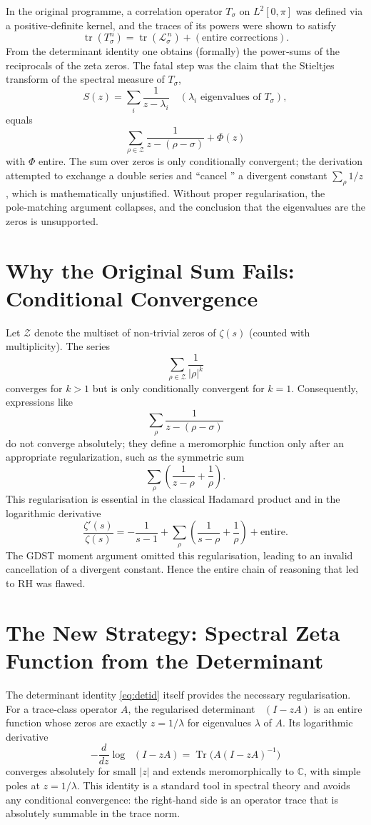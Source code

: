 \documentclass[11pt,a4paper]{article}
\newcommand{\C}{\mathbb{C}}
\newcommand{\LOp}{\mathcal{L}}
\newcommand{\tr}{\operatorname{tr}}
\newcommand{\Tr}{\operatorname{Tr}}
\DeclareMathOperator{\detreg}{det_{(2)}}
\begin{document}
In the original programme, a correlation operator \(T_\sigma\) on \(L^2[0,\pi]\) was defined via a positive‑definite kernel, and the traces of its powers were shown to satisfy
\[
\tr(T_\sigma^n) = \tr(\LOp_\sigma^{\,n}) + (\text{entire corrections}).
\]
From the determinant identity one obtains (formally) the power‑sums of the reciprocals of the zeta zeros. The fatal step was the claim that the Stieltjes transform of the spectral measure of \(T_\sigma\),
\[
S(z) = \sum_i \frac{1}{z - \lambda_i} \quad (\lambda_i \text{ eigenvalues of } T_\sigma),
\]
equals
\[
\sum_{\rho\in\mathcal{Z}} \frac{1}{z - (\rho - \sigma)} + \Phi(z)
\]
with \(\Phi\) entire. The sum over zeros is only conditionally convergent; the derivation attempted to exchange a double series and ``cancel '' a divergent constant \(\sum_\rho 1/z\), which is mathematically unjustified. Without proper regularisation, the pole‑matching argument collapses, and the conclusion that the eigenvalues are the zeros is unsupported.

\section{Why the Original Sum Fails: Conditional Convergence}

Let \(\mathcal{Z}\) denote the multiset of non‑trivial zeros of \(\zeta(s)\) (counted with multiplicity). The series
\[
\sum_{\rho\in\mathcal{Z}} \frac{1}{|\rho|^k}
\]
converges for \(k > 1\) but is only conditionally convergent for \(k = 1\). Consequently, expressions like
\[
\sum_{\rho} \frac{1}{z - (\rho - \sigma)}
\]
do not converge absolutely; they define a meromorphic function only after an appropriate regularization, such as the symmetric sum
\[
\sum_{\rho} \left( \frac{1}{z - \rho} + \frac{1}{\rho} \right).
\]
This regularisation is essential in the classical Hadamard product and in the logarithmic derivative
\[
\frac{\zeta'(s)}{\zeta(s)} = -\frac{1}{s-1} + \sum_{\rho} \left( \frac{1}{s-\rho} + \frac{1}{\rho} \right) + \text{entire}.
\]
The GDST moment argument omitted this regularisation, leading to an invalid cancellation of a divergent constant. Hence the entire chain of reasoning that led to RH was flawed.

\section{The New Strategy: Spectral Zeta Function from the Determinant}

The determinant identity \eqref{eq:detid} itself provides the necessary regularisation. For a trace‑class operator \(A\), the regularised determinant \(\detreg(I - zA)\) is an entire function whose zeros are exactly \(z = 1/\lambda\) for eigenvalues \(\lambda\) of \(A\). Its logarithmic derivative
\[
- \frac{d}{dz} \log \detreg(I - zA) = \Tr\bigl( A (I - zA)^{-1} \bigr)
\]
converges absolutely for small \(|z|\) and extends meromorphically to \(\C\), with simple poles at \(z = 1/\lambda\). This identity is a standard tool in spectral theory and avoids any conditional convergence: the right‑hand side is an operator trace that is absolutely summable in the trace norm.
\end{document}
